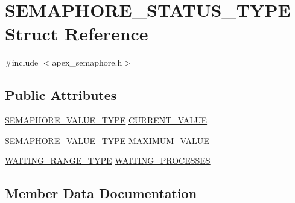 \hypertarget{structSEMAPHORE__STATUS__TYPE}{}\section{S\+E\+M\+A\+P\+H\+O\+R\+E\+\_\+\+S\+T\+A\+T\+U\+S\+\_\+\+T\+Y\+PE Struct Reference}
\label{structSEMAPHORE__STATUS__TYPE}


{\ttfamily \#include $<$apex\+\_\+semaphore.\+h$>$}

\subsection*{Public Attributes}
\begin{DoxyCompactItemize}
\item 
\hyperlink{apex__semaphore_8h_a6a4f4a98d5659e166b13ded30fd03d8e}{S\+E\+M\+A\+P\+H\+O\+R\+E\+\_\+\+V\+A\+L\+U\+E\+\_\+\+T\+Y\+PE} \hyperlink{structSEMAPHORE__STATUS__TYPE_a9bc5c320be2f437679f9ce1b0a3037c2}{C\+U\+R\+R\+E\+N\+T\+\_\+\+V\+A\+L\+UE}
\item 
\hyperlink{apex__semaphore_8h_a6a4f4a98d5659e166b13ded30fd03d8e}{S\+E\+M\+A\+P\+H\+O\+R\+E\+\_\+\+V\+A\+L\+U\+E\+\_\+\+T\+Y\+PE} \hyperlink{structSEMAPHORE__STATUS__TYPE_a11b9250a6a0f09b0db3a46c506fc3a5f}{M\+A\+X\+I\+M\+U\+M\+\_\+\+V\+A\+L\+UE}
\item 
\hyperlink{apex__process_8h_a77a39a661169092676366eec0d65ab1c}{W\+A\+I\+T\+I\+N\+G\+\_\+\+R\+A\+N\+G\+E\+\_\+\+T\+Y\+PE} \hyperlink{structSEMAPHORE__STATUS__TYPE_a0fde4e667b650c5ca565b245187ab652}{W\+A\+I\+T\+I\+N\+G\+\_\+\+P\+R\+O\+C\+E\+S\+S\+ES}
\end{DoxyCompactItemize}


\subsection{Member Data Documentation}
